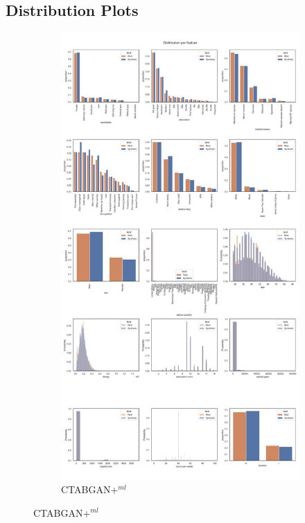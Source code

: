 \subsection[]{Distribution Plots}
\label{A:distributions}
\begin{figure}[h]
	\centering
	\begin{subfigure}{0.6\linewidth}
		\includegraphics[height=\textheight,width=\linewidth,keepaspectratio]{images/distributions_full/ctabgan+.jpg}
		\caption{CTABGAN+$^{ml}$}
	\end{subfigure}
\end{figure}


